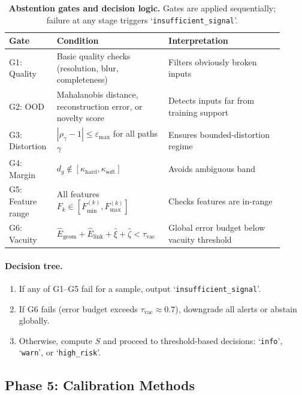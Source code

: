 \documentclass[11pt]{article}
\theoremstyle{remark}
\theoremstyle{plain}
\begin{document}
\begin{table}[H]
\centering
\caption{\textbf{Abstention gates and decision logic.} Gates are applied sequentially; failure at any stage triggers `\texttt{insufficient\_signal}'.}
\label{tab:abstention-gates}
\begin{tabularx}{\linewidth}{@{}p{0.16\linewidth}p{0.35\linewidth}p{0.40\linewidth}@{}}
\toprule
\textbf{Gate} & \textbf{Condition} & \textbf{Interpretation} \\
\midrule
G1: Quality & Basic quality checks (resolution, blur, completeness) & Filters obviously broken inputs \\
\addlinespace[2pt]
G2: OOD & Mahalanobis distance, reconstruction error, or novelty score & Detects inputs far from training support \\
\addlinespace[2pt]
G3: Distortion & $|\rho_\gamma - 1| \le \varepsilon_{\max}$ for all paths $\gamma$ & Ensures bounded-distortion regime \\
\addlinespace[2pt]
G4: Margin & $d_g \notin [\kappa_{\mathrm{hard}}, \kappa_{\mathrm{soft}}]$ & Avoids ambiguous band \\
\addlinespace[2pt]
G5: Feature range & All features $F_k \in [F_{\min}^{(k)}, F_{\max}^{(k)}]$ & Checks features are in-range \\
\addlinespace[2pt]
G6: Vacuity & $\hat E_{\mathrm{geom}} + \hat E_{\mathrm{link}} + \hat\xi + \hat\zeta < \tau_{\mathrm{vac}}$ & Global error budget below vacuity threshold \\
\bottomrule
\end{tabularx}
\end{table}

\paragraph{Decision tree.}
\begin{enumerate}[label=\arabic*.,leftmargin=*]
  \item If any of G1--G5 fail for a sample, output `\texttt{insufficient\_signal}'.
  \item If G6 fails (error budget exceeds $\tau_{\mathrm{vac}} \approx 0.7$), downgrade all alerts or abstain globally.
  \item Otherwise, compute $S$ and proceed to threshold-based decisions: `\texttt{info}', `\texttt{warn}', or `\texttt{high\_risk}'.
\end{enumerate}

\subsection{Phase 5: Calibration Methods}
\label{subsec:calibration-methods}
\end{document}
